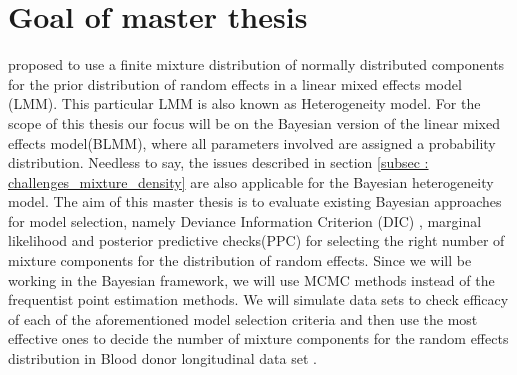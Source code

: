 \section{Goal of master thesis}
\label{sec : goal}
\citet*{verbeke_linear_1996} proposed to use a finite mixture distribution of normally distributed components for the prior distribution of random effects in a linear mixed effects model (LMM). This particular LMM is also known as Heterogeneity model. For the scope of this thesis our focus will be on the Bayesian version of the linear mixed effects model(BLMM), where all parameters involved are assigned a probability distribution. Needless to say, the issues described in section \ref{subsec : challenges_mixture_density} are also applicable for the Bayesian heterogeneity model. The aim of this master thesis is to evaluate existing Bayesian approaches for model selection, namely Deviance Information Criterion (DIC) , marginal likelihood and posterior predictive checks(PPC) for selecting the right number of mixture components for the distribution of random effects. Since we will be working in the Bayesian framework, we will use MCMC methods instead of the frequentist point estimation methods. We will simulate data sets to check efficacy of each of the aforementioned model selection criteria and then use the most effective ones to decide the number of mixture components for the random effects distribution in Blood donor longitudinal data set \citep{nasserinejad_prevalence_2015}.